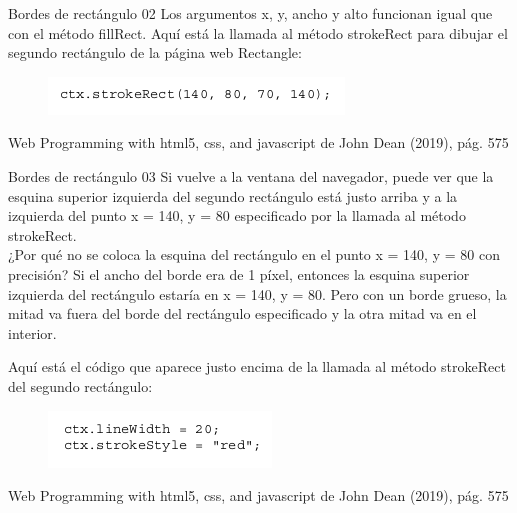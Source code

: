 \begin{frame}{Bordes de rectángulo 02}
\justifying
Los argumentos x, y, ancho y alto funcionan igual que con el método fillRect.
Aquí está la llamada al método strokeRect para dibujar el segundo rectángulo de la página web Rectangle:

\begin{figure}[H]
\centering
\includegraphics[scale=0.4]{Section_Files/images/Sec02/12.png}
\end{figure}


{\tiny Web Programming with html5, css, and javascript de John Dean (2019), pág. 575}
\end{frame}

\begin{frame}{Bordes de rectángulo 03}
\justifying
Si vuelve a la ventana del navegador, puede ver que la esquina superior izquierda del segundo rectángulo está justo arriba y a la izquierda del punto x = 140, y = 80 especificado por la llamada al método strokeRect.\\
¿Por qué no se coloca la esquina del rectángulo en el punto x = 140, y = 80 con precisión? Si el ancho del borde era de 1 píxel, entonces la esquina superior izquierda del rectángulo estaría en x = 140, y = 80. Pero con un borde grueso, la mitad va fuera del borde del rectángulo especificado y la otra mitad va en el interior.

Aquí está el código que aparece justo encima de la llamada al método strokeRect del segundo rectángulo:

\begin{figure}[H]
\centering
\includegraphics[scale=0.4]{Section_Files/images/Sec02/13.png}
\end{figure}

{\tiny Web Programming with html5, css, and javascript de John Dean (2019), pág. 575}
\end{frame}